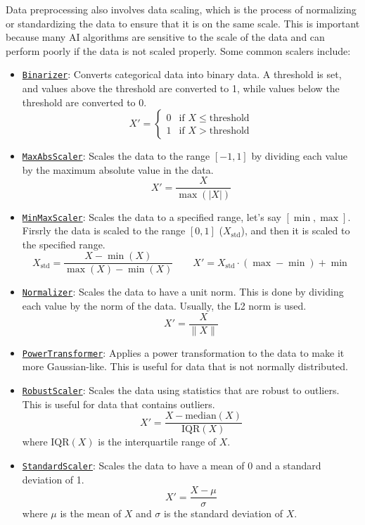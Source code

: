 Data preprocessing also involves data scaling, which is the process of normalizing or standardizing the data to ensure that it is on the same scale. This is important because many AI algorithms are sensitive to the scale of the data and can perform poorly if the data is not scaled properly. Some common scalers include:
\begin{itemize}
    \item \ul{\texttt{Binarizer}}: Converts categorical data into binary data. A threshold is set, and values above the threshold are converted to 1, while values below the threshold are converted to 0.
    \begin{equation*}
        X' = \begin{cases}
            0 & \text{if } X \leq \text{threshold} \\
            1 & \text{if } X > \text{threshold}
        \end{cases}
    \end{equation*}
    \item \ul{\texttt{MaxAbsScaler}}: Scales the data to the range $[-1, 1]$ by dividing each value by the maximum absolute value in the data.
    \begin{equation*}
        X' = \frac{X}{\max(|X|)}
    \end{equation*}
    \item \ul{\texttt{MinMaxScaler}}: Scales the data to a specified range, let's say $[\min, \max]$. Firsrly the data is scaled to the range $[0, 1]$ ($X_{\text{std}}$), and then it is scaled to the specified range.
    \begin{equation*}
        X_{\text{std}} = \frac{X - \min(X)}{\max(X) - \min(X)}\qquad X' = X_{\text{std}} \cdot (\max - \min) + \min
    \end{equation*}
    \item \ul{\texttt{Normalizer}}: Scales the data to have a unit norm. This is done by dividing each value by the norm of the data. Usually, the L2 norm is used.
    \begin{equation*}
        X' = \frac{X}{\|X\|}
    \end{equation*}
    \item \ul{\texttt{PowerTransformer}}: Applies a power transformation to the data to make it more Gaussian-like. This is useful for data that is not normally distributed.
    \item \ul{\texttt{RobustScaler}}: Scales the data using statistics that are robust to outliers. This is useful for data that contains outliers.
    \begin{equation*}
        X' = \frac{X - \text{median}(X)}{\text{IQR}(X)}
    \end{equation*}
    where $\text{IQR}(X)$ is the interquartile range of $X$.
    \item \ul{\texttt{StandardScaler}}: Scales the data to have a mean of 0 and a standard deviation of 1.
    \begin{equation*}
        X' = \frac{X - \mu}{\sigma}
    \end{equation*}
    where $\mu$ is the mean of $X$ and $\sigma$ is the standard deviation of $X$.
\end{itemize}

